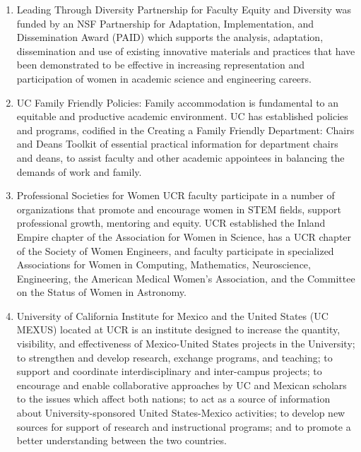 \documentclass[12pt]{article}
\begin{document}
\begin{enumerate}
\item Leading Through Diversity Partnership for Faculty Equity and
  Diversity was funded by an NSF Partnership for Adaptation,
  Implementation, and Dissemination Award (PAID) which supports the
  analysis, adaptation, dissemination and use of existing innovative
  materials and practices that have been demonstrated to be effective
  in increasing representation and participation of women in academic
  science and engineering careers.

\item UC Family Friendly Policies: Family accommodation is fundamental
  to an equitable and productive academic environment. UC has
  established policies and programs, codified in the Creating a Family
  Friendly Department: Chairs and Deans Toolkit of essential practical
  information for department chairs and deans, to assist faculty and
  other academic appointees in balancing the demands of work and
  family.

\item Professional Societies for Women UCR faculty participate in a
  number of organizations that promote and encourage women in STEM
  fields, support professional growth, mentoring and equity.  UCR
  established the Inland Empire chapter of the Association for Women
  in Science, has a UCR chapter of the Society of Women Engineers, and
  faculty participate in specialized Associations for Women in
  Computing, Mathematics, Neuroscience, Engineering, the American
  Medical Women’s Association, and the Committee on the Status of
  Women in Astronomy.

\item University of California Institute for Mexico and the United
  States (UC MEXUS) located at UCR is an institute designed to
  increase the quantity, visibility, and effectiveness of
  Mexico-United States projects in the University; to strengthen and
  develop research, exchange programs, and teaching; to support and
  coordinate interdisciplinary and inter-campus projects; to encourage
  and enable collaborative approaches by UC and Mexican scholars to
  the issues which affect both nations; to act as a source of
  information about University-sponsored United States-Mexico
  activities; to develop new sources for support of research and
  instructional programs; and to promote a better understanding
  between the two countries.
\end{enumerate}
\end{document}
